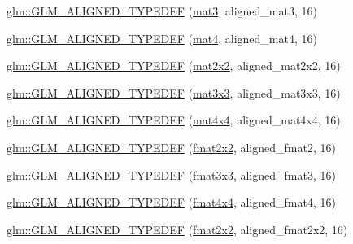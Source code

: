 \begin{DoxyCompactItemize}
\item 
\mbox{\hyperlink{group__gtx__type__aligned_ga17f911ee7b78ca6d1b91c4ab51ddb73c}{glm\+::\+G\+L\+M\+\_\+\+A\+L\+I\+G\+N\+E\+D\+\_\+\+T\+Y\+P\+E\+D\+EF}} (\mbox{\hyperlink{group__core__types_gadfaff2a7dce5cbf4e77a47ecea42ac5b}{mat3}}, aligned\+\_\+mat3, 16)
\item 
\mbox{\hyperlink{group__gtx__type__aligned_ga31940e6012b72110e26fdb0f54805033}{glm\+::\+G\+L\+M\+\_\+\+A\+L\+I\+G\+N\+E\+D\+\_\+\+T\+Y\+P\+E\+D\+EF}} (\mbox{\hyperlink{group__core__types_ga7dcd2365c2e368e6af5b7adeb6a9c8df}{mat4}}, aligned\+\_\+mat4, 16)
\item 
\mbox{\hyperlink{group__gtx__type__aligned_ga01de96cd0b541c52d2b4a3faf65822e9}{glm\+::\+G\+L\+M\+\_\+\+A\+L\+I\+G\+N\+E\+D\+\_\+\+T\+Y\+P\+E\+D\+EF}} (\mbox{\hyperlink{group__core__types_gaeddc14adb4963d9bad73866cc202fb40}{mat2x2}}, aligned\+\_\+mat2x2, 16)
\item 
\mbox{\hyperlink{group__gtx__type__aligned_gac88a191b004bd341e64fc53b5a4d00e3}{glm\+::\+G\+L\+M\+\_\+\+A\+L\+I\+G\+N\+E\+D\+\_\+\+T\+Y\+P\+E\+D\+EF}} (\mbox{\hyperlink{group__core__types_ga6fecca6a869070b6bf8acb44ce1c2af3}{mat3x3}}, aligned\+\_\+mat3x3, 16)
\item 
\mbox{\hyperlink{group__gtx__type__aligned_gabe8c745fa2ced44a600a6e3f19991161}{glm\+::\+G\+L\+M\+\_\+\+A\+L\+I\+G\+N\+E\+D\+\_\+\+T\+Y\+P\+E\+D\+EF}} (\mbox{\hyperlink{group__core__types_ga63e3ee9447ed593484140a9368e738ec}{mat4x4}}, aligned\+\_\+mat4x4, 16)
\item 
\mbox{\hyperlink{group__gtx__type__aligned_ga719da577361541a4c43a2dd1d0e361e1}{glm\+::\+G\+L\+M\+\_\+\+A\+L\+I\+G\+N\+E\+D\+\_\+\+T\+Y\+P\+E\+D\+EF}} (\mbox{\hyperlink{group__gtc__type__precision_ga20fdbcc6b16bed27ad25db9b71d09e93}{fmat2x2}}, aligned\+\_\+fmat2, 16)
\item 
\mbox{\hyperlink{group__gtx__type__aligned_ga6e7ee4f541e1d7db66cd1a224caacafb}{glm\+::\+G\+L\+M\+\_\+\+A\+L\+I\+G\+N\+E\+D\+\_\+\+T\+Y\+P\+E\+D\+EF}} (\mbox{\hyperlink{group__gtc__type__precision_ga577209f19554f5291cc3d66dda9a4388}{fmat3x3}}, aligned\+\_\+fmat3, 16)
\item 
\mbox{\hyperlink{group__gtx__type__aligned_gae5d672d359f2a39f63f98c7975057486}{glm\+::\+G\+L\+M\+\_\+\+A\+L\+I\+G\+N\+E\+D\+\_\+\+T\+Y\+P\+E\+D\+EF}} (\mbox{\hyperlink{group__gtc__type__precision_ga16b508b75c7213ba6b24055ff3b7503d}{fmat4x4}}, aligned\+\_\+fmat4, 16)
\item 
\mbox{\hyperlink{group__gtx__type__aligned_ga6fa2df037dbfc5fe8c8e0b4db8a34953}{glm\+::\+G\+L\+M\+\_\+\+A\+L\+I\+G\+N\+E\+D\+\_\+\+T\+Y\+P\+E\+D\+EF}} (\mbox{\hyperlink{group__gtc__type__precision_ga20fdbcc6b16bed27ad25db9b71d09e93}{fmat2x2}}, aligned\+\_\+fmat2x2, 16)

\end{DoxyCompactItemize}
